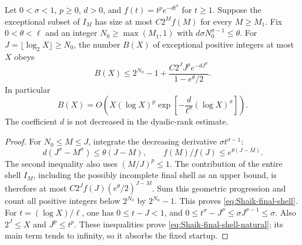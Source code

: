 \begin{lemma}
\label{lem:Shaik-final-shell}
Let \(0<\sigma<1\), \(p\ge0\), \(d>0\), and
\(f(t)=t^p e^{-dt^\sigma}\) for \(t\ge1\).
Suppose the exceptional subset of \(I_M\) has size at most
\(C2^Mf(M)\) for every \(M\ge M_1\).
Fix \(0<\theta<\ell\) and an integer \(N_0\ge\max(M_1,1)\) with
\(d\sigma N_0^{\sigma-1}\le\theta\).
For \(J=\lfloor\log_2X\rfloor\ge N_0\), the number \(B(X)\) of
exceptional positive integers at most \(X\) obeys
\begin{equation}\label{eq:Shaik-final-shell}
 B(X)\le2^{N_0}-1+
 \frac{C2^J J^p e^{-dJ^\sigma}}{1-e^\theta/2}.
\end{equation}
In particular
\begin{equation}\label{eq:Shaik-final-shell-natural}
 B(X)=O\left(X(\log X)^p
       \exp\left[-\frac d{\ell^\sigma}(\log X)^\sigma\right]\right).
\end{equation}
The coefficient \(d\) is not decreased in the dyadic-rank estimate.
\end{lemma}
\begin{proof}
For \(N_0\le M\le J\), integrate the decreasing derivative
\(\sigma t^{\sigma-1}\):
\[
 d(J^\sigma-M^\sigma)\le\theta(J-M),\qquad
 f(M)/f(J)\le e^{\theta(J-M)}.
\]
The second inequality also uses \((M/J)^p\le1\).
The contribution of the entire shell \(I_M\), including the possibly
incomplete final shell as an upper bound, is therefore at most
\(C2^Jf(J)(e^\theta/2)^{J-M}\).
Sum this geometric progression and count all positive integers below
\(2^{N_0}\) by \(2^{N_0}-1\). This proves \eqref{eq:Shaik-final-shell}.
For \(t=(\log X)/\ell\), one has \(0\le t-J<1\), and
\(0\le t^\sigma-J^\sigma\le\sigma J^{\sigma-1}\le\sigma\).
Also \(2^J\le X\) and \(J^p\le t^p\).
These inequalities prove \eqref{eq:Shaik-final-shell-natural};
its main term tends to infinity, so it absorbs the fixed startup.
\end{proof}

